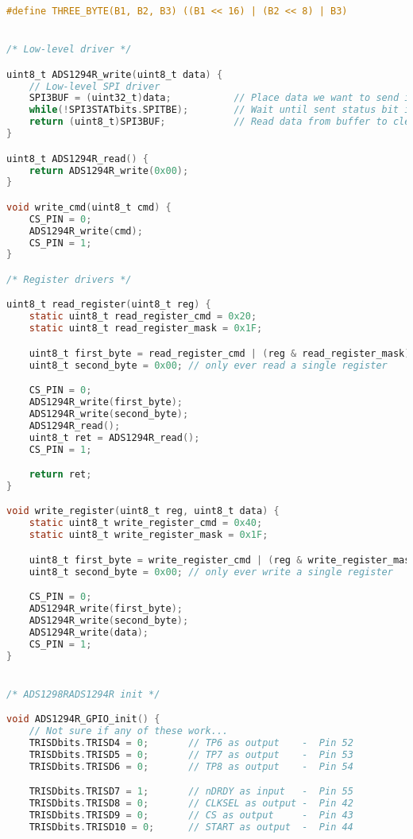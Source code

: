 \begin{lstlisting}[language=C]
#define THREE_BYTE(B1, B2, B3) ((B1 << 16) | (B2 << 8) | B3)


/* Low-level driver */

uint8_t ADS1294R_write(uint8_t data) {
    // Low-level SPI driver
    SPI3BUF = (uint32_t)data;           // Place data we want to send in SPI buffer
    while(!SPI3STATbits.SPITBE);        // Wait until sent status bit is cleared
    return (uint8_t)SPI3BUF;            // Read data from buffer to clear it
}

uint8_t ADS1294R_read() {
    return ADS1294R_write(0x00);
}

void write_cmd(uint8_t cmd) {
    CS_PIN = 0;
    ADS1294R_write(cmd);
    CS_PIN = 1;
}

/* Register drivers */

uint8_t read_register(uint8_t reg) {
    static uint8_t read_register_cmd = 0x20;
    static uint8_t read_register_mask = 0x1F;

    uint8_t first_byte = read_register_cmd | (reg & read_register_mask);
    uint8_t second_byte = 0x00; // only ever read a single register

    CS_PIN = 0;
    ADS1294R_write(first_byte);
    ADS1294R_write(second_byte);
    ADS1294R_read();
    uint8_t ret = ADS1294R_read();
    CS_PIN = 1;

    return ret;
}

void write_register(uint8_t reg, uint8_t data) {
    static uint8_t write_register_cmd = 0x40;
    static uint8_t write_register_mask = 0x1F;

    uint8_t first_byte = write_register_cmd | (reg & write_register_mask);
    uint8_t second_byte = 0x00; // only ever write a single register

    CS_PIN = 0;
    ADS1294R_write(first_byte);
    ADS1294R_write(second_byte);
    ADS1294R_write(data);
    CS_PIN = 1;
}


/* ADS1298RADS1294R init */

void ADS1294R_GPIO_init() {
    // Not sure if any of these work...
    TRISDbits.TRISD4 = 0;       // TP6 as output    -  Pin 52
    TRISDbits.TRISD5 = 0;       // TP7 as output    -  Pin 53
    TRISDbits.TRISD6 = 0;       // TP8 as output    -  Pin 54

    TRISDbits.TRISD7 = 1;       // nDRDY as input   -  Pin 55
    TRISDbits.TRISD8 = 0;       // CLKSEL as output -  Pin 42
    TRISDbits.TRISD9 = 0;       // CS as output     -  Pin 43
    TRISDbits.TRISD10 = 0;      // START as output  -  Pin 44


\end{lstlisting}
